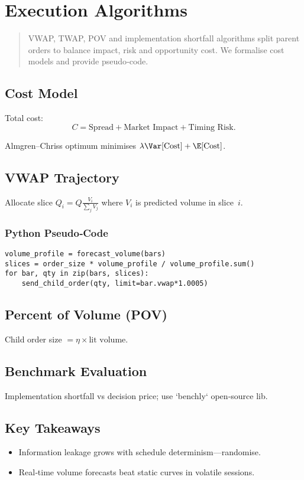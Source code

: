 \chapter{Execution Algorithms}\label{ch:execution}

\begin{abstract}
VWAP, TWAP, POV and implementation shortfall algorithms split parent
orders to balance impact, risk and opportunity cost.  We formalise cost
models and provide pseudo‑code.
\end{abstract}

\section{Cost Model}

Total cost:
\[
C = \text{Spread} + \text{Market Impact} + \text{Timing Risk}.
\]

Almgren–Chriss optimum minimises
\(\lambda \Var[\text{Cost}] + \E[\text{Cost}]\).

\section{VWAP Trajectory}

Allocate slice \(Q_i = Q \frac{V_i}{\sum_j V_j}\) where \(V_i\) is
predicted volume in slice \(i\).

\subsection*{Python Pseudo‑Code}

\begin{verbatim}
volume_profile = forecast_volume(bars)
slices = order_size * volume_profile / volume_profile.sum()
for bar, qty in zip(bars, slices):
    send_child_order(qty, limit=bar.vwap*1.0005)
\end{verbatim}

\section{Percent of Volume (POV)}

Child order size \(= \eta \times \text{lit volume}\).

\section{Benchmark Evaluation}

Implementation shortfall vs decision price; use `benchly` open‑source lib.

\section*{Key Takeaways}
\begin{itemize}
  \item Information leakage grows with schedule determinism—randomise.
  \item Real‑time volume forecasts beat static curves in volatile sessions.
\end{itemize}
